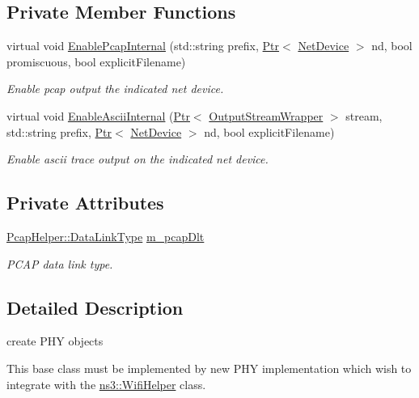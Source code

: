 \subsection*{Private Member Functions}
\begin{DoxyCompactItemize}
\item 
virtual void \hyperlink{classns3_1_1WifiPhyHelper_a1d0dc819ef2e257409b6b84924d07085}{Enable\+Pcap\+Internal} (std\+::string prefix, \hyperlink{classns3_1_1Ptr}{Ptr}$<$ \hyperlink{classns3_1_1NetDevice}{Net\+Device} $>$ nd, bool promiscuous, bool explicit\+Filename)
\begin{DoxyCompactList}\small\item\em Enable pcap output the indicated net device. \end{DoxyCompactList}\item 
virtual void \hyperlink{classns3_1_1WifiPhyHelper_a930fe270c6c08af23d5333b87ed5997b}{Enable\+Ascii\+Internal} (\hyperlink{classns3_1_1Ptr}{Ptr}$<$ \hyperlink{classns3_1_1OutputStreamWrapper}{Output\+Stream\+Wrapper} $>$ stream, std\+::string prefix, \hyperlink{classns3_1_1Ptr}{Ptr}$<$ \hyperlink{classns3_1_1NetDevice}{Net\+Device} $>$ nd, bool explicit\+Filename)
\begin{DoxyCompactList}\small\item\em Enable ascii trace output on the indicated net device. \end{DoxyCompactList}\end{DoxyCompactItemize}
\subsection*{Private Attributes}
\begin{DoxyCompactItemize}
\item 
\hyperlink{classns3_1_1PcapHelper_a2ee4dad28ddd9a1fe636f51835eaa77f}{Pcap\+Helper\+::\+Data\+Link\+Type} \hyperlink{classns3_1_1WifiPhyHelper_a5d28515f3c747bf279568538546bb2a2}{m\+\_\+pcap\+Dlt}
\begin{DoxyCompactList}\small\item\em P\+C\+AP data link type. \end{DoxyCompactList}\end{DoxyCompactItemize}


\subsection{Detailed Description}
create P\+HY objects 

This base class must be implemented by new P\+HY implementation which wish to integrate with the \hyperlink{classns3_1_1WifiHelper}{ns3\+::\+Wifi\+Helper} class. 

